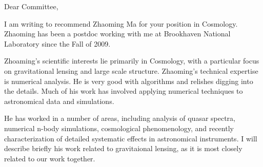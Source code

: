 \documentclass[12pt]{letter}
\begin{document}
\begin{letter}{}

\opening{Dear Committee,}

I am writing to recommend Zhaoming Ma for your position in Cosmology. Zhaoming
has been a postdoc working with me at Brookhaven National Laboratory since the
Fall of 2009.

Zhoaming's scientific interests lie primarily in Cosmology, with a particular
focus on gravitational lensing and large scale structure.  Zhaoming's technical
expertise is numerical analysis. He is very good with algorithms and relishes
digging into the details.  Much of his work has involved applying numerical
techniques to astronomical data and simulations.

He has worked in a number of areas, including analysis of quasar spectra,
numerical n-body simulations, cosmological phenomenology, and recently
characterization of detailed systematic effects in astronomical instruments.  I
will describe briefly his work related to gravitaional lensing, as it is most
closely related to our work together.

\begin{comment}

I'll go briefly into Zhaoming's previous work before talking about our work
together. For Zhaoming's thesis work, he modified an n-body code to use
arbitrary power spectra and a dark energy equation of state, facilitating
detailed studies and predictions in our modern view of the universe. This is
highly relevant now as cosmological probes become more precise and we can begin
to probe these fundamental physical aspects of our universe.  It was also a
technical challenge that he met readily. 

Zhaoming developed a code to find the eigenspectra of quasars using principle
component analysis.  These spectra are highly complex, and not entirely
uniform, but PCA gives useful classification information.  I single out this
study because Zhaoming's knowledge of this technique has been important for our
work.
\end{comment}


\end{letter}
\end{document}
